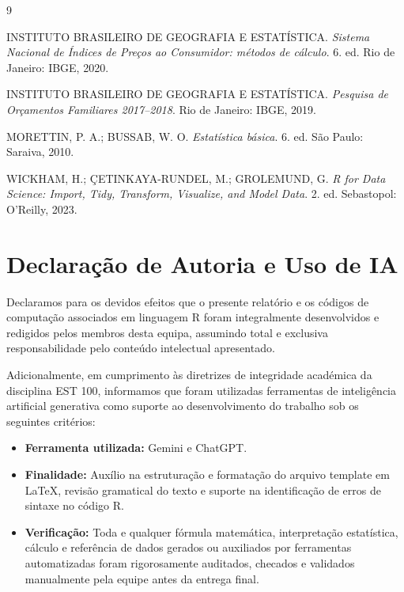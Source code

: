\documentclass[12pt,a4paper]{article}
\begin{document}
\newpage
\begin{thebibliography}{9}
\label{sec:referencias}

INSTITUTO BRASILEIRO DE GEOGRAFIA E ESTATÍSTICA. 
\textit{Sistema Nacional de Índices de Preços ao Consumidor: métodos de cálculo}. 6. ed. Rio de Janeiro: IBGE, 2020.

INSTITUTO BRASILEIRO DE GEOGRAFIA E ESTATÍSTICA. 
\textit{Pesquisa de Orçamentos Familiares 2017–2018}. Rio de Janeiro: IBGE, 2019.

MORETTIN, P. A.; BUSSAB, W. O. 
\textit{Estatística básica}. 6. ed. São Paulo: Saraiva, 2010.

WICKHAM, H.; ÇETINKAYA-RUNDEL, M.; GROLEMUND, G. 
\textit{R for Data Science: Import, Tidy, Transform, Visualize, and Model Data}. 2. ed. Sebastopol: O'Reilly, 2023.

\end{thebibliography}


\newpage
\section*{Declaração de Autoria e Uso de IA}

Declaramos para os devidos efeitos que o presente relatório e os códigos de computação associados em linguagem R foram integralmente desenvolvidos e redigidos pelos membros desta equipa, assumindo total e exclusiva responsabilidade pelo conteúdo intelectual apresentado.

Adicionalmente, em cumprimento às diretrizes de integridade académica da disciplina EST 100, informamos que foram utilizadas ferramentas de inteligência artificial generativa como suporte ao desenvolvimento do trabalho sob os seguintes critérios:

\begin{itemize}
    \item \textbf{Ferramenta utilizada:} Gemini e ChatGPT.
    \item \textbf{Finalidade:}  Auxílio na estruturação e formatação do arquivo template em LaTeX, revisão gramatical do texto e suporte na identificação de erros de sintaxe no código R.
    \item \textbf{Verificação:} Toda e qualquer fórmula matemática, interpretação estatística, cálculo e referência de dados gerados ou auxiliados por ferramentas automatizadas foram rigorosamente auditados, checados e validados manualmente pela equipe antes da entrega final.
\end{itemize}
\end{document}
